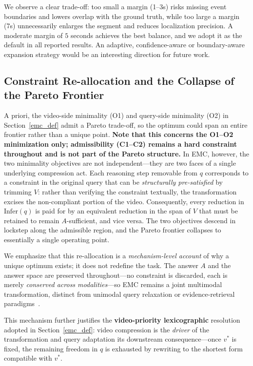 We observe a clear trade-off: too small a margin (1--3s) risks missing event boundaries and lowers overlap with the ground truth, while too large a margin (7s) unnecessarily enlarges the segment and reduces localization precision. A moderate margin of $5$ seconds achieves the best balance, and we adopt it as the default in all reported results. An adaptive, confidence-aware or boundary-aware expansion strategy would be an interesting direction for future work.

\subsection{Constraint Re-allocation and the Collapse of the Pareto Frontier}
\label{appendix:pareto_collapse}

A priori, the video-side minimality (O1) and query-side minimality (O2) in Section~\ref{emc_def} admit a Pareto trade-off, so the optimum could span an entire frontier rather than a unique point. \textbf{Note that this concerns the O1--O2 minimization only; admissibility (C1--C2) remains a hard constraint throughout and is not part of the Pareto structure.} In EMC, however, the two minimality objectives are not independent---they are two faces of a single underlying compression act. Each reasoning step removable from $q$ corresponds to a constraint in the original query that can be \textit{structurally pre-satisfied} by trimming $V$: rather than verifying the constraint textually, the transformation excises the non-compliant portion of the video. Consequently, every reduction in $\mathrm{Infer}(q)$ is paid for by an equivalent reduction in the span of $V$ that must be retained to remain $A$-sufficient, and vice versa. The two objectives descend in lockstep along the admissible region, and the Pareto frontier collapses to essentially a single operating point.

We emphasize that this re-allocation is a \textit{mechanism-level account} of why a unique optimum exists; it does not redefine the task. The answer $A$ and the answer space are preserved throughout---no constraint is discarded, each is merely \textit{conserved across modalities}---so EMC remains a joint multimodal transformation, distinct from unimodal query relaxation or evidence-retrieval paradigms~\citep{nextgqa, cgbench}.

This mechanism further justifies the \textbf{video-priority lexicographic} resolution adopted in Section~\ref{emc_def}: video compression is the \textit{driver} of the transformation and query adaptation its downstream consequence---once $v^*$ is fixed, the remaining freedom in $q$ is exhausted by rewriting to the shortest form compatible with $v^*$.

